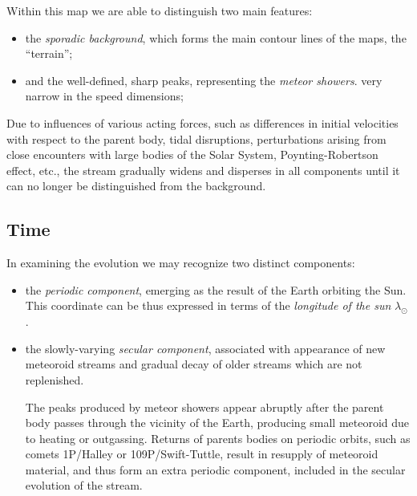     Within this map we are able to distinguish two main features:
    \begin{itemize}
        \item the \emph{sporadic background}, which forms the main contour lines of the maps, the ``terrain'';
        \item and the well-defined, sharp peaks, representing the \emph{meteor showers}.
            very narrow in the speed dimensions;
    \end{itemize}

    Due to influences of various acting forces, such as differences
    in initial velocities with respect to the parent body, tidal disruptions,
    perturbations arising from close encounters with large bodies of the Solar System,
    Poynting-Robertson effect, etc., the stream
    gradually widens and disperses in all components until it can no longer be distinguished from the background.

    \subsection{Time} \label{i}
        In examining the evolution we may recognize two distinct components:
        \begin{itemize}
            \item the \emph{periodic component}, emerging as the result of the Earth orbiting the Sun.
                This coordinate can be thus expressed in terms of the \emph{longitude of the sun} $\lambda_\odot$.

            \item the slowly-varying \emph{secular component}, associated with appearance of new meteoroid streams and gradual decay of older
                streams which are not replenished.

                The peaks produced by meteor showers appear abruptly after the parent body passes through the vicinity of the Earth,
                producing small meteoroid due to heating or outgassing.
                Returns of parents bodies on periodic orbits, such as comets 1P/Halley or 109P/Swift-Tuttle, result
                in resupply of meteoroid material, and thus form an extra periodic component, included in the secular evolution of the stream.

        \end{itemize}
